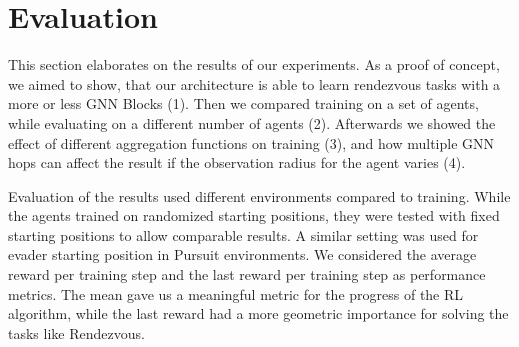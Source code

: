 
\chapter{Evaluation}
\label{ch:Evaluation}

This section elaborates on the results of our experiments. As a proof of concept, we aimed to show, that our architecture is able to learn rendezvous tasks with a more or less GNN Blocks (1). Then we compared training on a set of agents, while evaluating on a different number of agents (2). Afterwards we showed the effect of different aggregation functions on training (3), and how multiple GNN hops can affect the result if the observation radius for the agent varies (4). 
\par

Evaluation of the results used different environments compared to training. While the agents trained on randomized starting positions, they were tested with fixed starting positions to allow comparable results. A similar setting was used for evader starting position in Pursuit environments. We considered the average reward per training step and the last reward per training step as performance metrics. The mean gave us a meaningful metric for the progress of the RL algorithm, while the last reward had a more geometric importance for solving the tasks like Rendezvous.  \par

